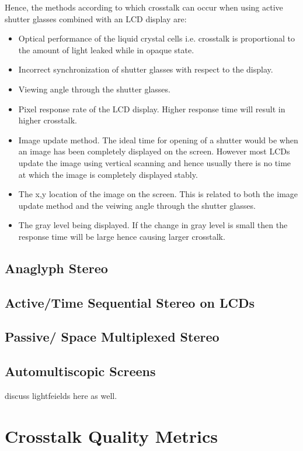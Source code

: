 Hence, the methods according to which crosstalk can occur when using active shutter glasses combined with an LCD display are:
\begin{itemize}
	\item{Optical performance of the liquid crystal cells i.e. crosstalk is proportional to the amount of light leaked while in opaque state.}
	\item{Incorrect synchronization of shutter glasses with respect to the display.}
	\item{Viewing angle through the shutter glasses.}
	\item{Pixel response rate of the LCD display. Higher response time will result in higher crosstalk.}
	\item{Image update method. The ideal time for opening of a shutter would be when an image has been completely displayed on the screen. However most LCDs update the image using vertical scanning and hence usually there is no time at which the image is completely displayed stably.}
	\item{The x,y location of the image on the screen. This is related to both the image update method and the veiwing angle through the shutter glasses.}
	\item{The gray level being displayed. If the change in gray level is small then the response time will be large hence causing larger crosstalk. }
\end{itemize}

\subsection{Anaglyph Stereo}
\subsection{Active/Time Sequential Stereo on LCDs}
\subsection{Passive/ Space Multiplexed Stereo}
\subsection{Automultiscopic Screens}
discuss lightfeields here as well.

\section{Crosstalk Quality Metrics}